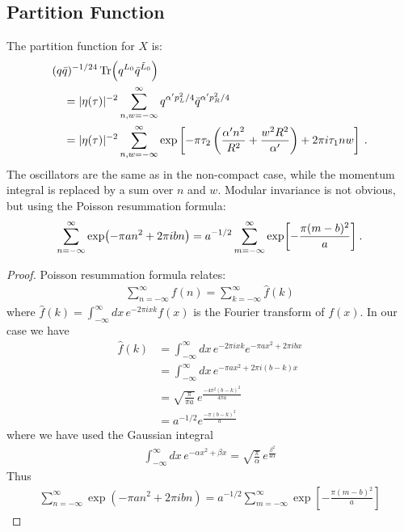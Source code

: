 \subsection*{Partition Function}
The partition function for $X$ is:
\begin{align}
	&(q \bar{q})^{-1 / 24} \operatorname{Tr}\Bigl(q^{L_{0}} \bar{q}^{\tilde{L}_{0}}\Bigr) \nonumber \\
	&\quad =|\eta(\tau)|^{-2} \sum_{n, w=-\infty}^{\infty} q^{\alpha^{\prime} p_{L}^{2} / 4} \bar{q}^{\alpha^{\prime} p_{R}^{2} / 4} \nonumber \\
	&\quad =|\eta(\tau)|^{-2} \sum_{n, w=-\infty}^{\infty} \exp \left[-\pi \tau_{2}\left(\frac{\alpha^{\prime} n^{2}}{R^{2}}+\frac{w^{2} R^{2}}{\alpha^{\prime}}\right)+2 \pi i \tau_{1} n w\right] \:. \label{8.2.9}
\end{align}
The oscillators are the same as in the non-compact case, while the momentum integral is replaced by a sum over $n$ and $w$. Modular invariance is not obvious, but using the Poisson resummation formula:
\begin{equation}
	\sum_{n=-\infty}^{\infty} \exp (-\pi a n^{2}+2 \pi i b n)=a^{-1 / 2} 
	\sum_{m=-\infty}^{\infty} \exp \biggl[-\frac{\pi(m-b)^{2}}{a}\biggr] \:. \label{8.2.10}
\end{equation}
\begin{tcolorbox}[breakable]
	\begin{proof}
		Poisson resummation formula relates:
		\begin{align*}
			\sum_{n=-\infty}^{\infty} f(n) = \sum_{k=-\infty}^{\infty} \hat{f}(k) \tag{8.88}
		\end{align*}		
		where \(\hat{f}(k) = \int_{-\infty}^{\infty} dx \, e^{-2\pi i x k} f(x)\) is the Fourier transform of \(f(x)\). In our case we have
		\begin{align*}
			\hat{f}(k) &= \int_{-\infty}^{\infty} dx \, e^{-2\pi i x k} e^{-\pi a x^2 + 2\pi ibx} \\
			&= \int_{-\infty}^{\infty} dx \, e^{-\pi a x^2 + 2\pi i (b-k)x} \\
			&= \sqrt{\frac{\pi}{\pi a}} \, e^{\frac{-4\pi^2 (b-k)^2}{4\pi a}} \\
			&= a^{-1/2} e^{\frac{-\pi (b-k)^2}{a}} \tag{8.89}
		\end{align*}
		where we have used the Gaussian integral
		\begin{align*}
			\int_{-\infty}^{\infty} dx \, e^{-\alpha x^2 + \beta x} = \sqrt{\frac{\pi}{\alpha}} \, e^{\frac{\beta^2}{4\alpha}}
		\end{align*}
		Thus
		\begin{align*}
			\sum_{n=-\infty}^{\infty} \exp\left(-\pi a n^2 + 2\pi i b n\right) 
			= a^{-1/2} \sum_{m=-\infty}^{\infty} \exp\left[-\frac{\pi (m-b)^2}{a}\right]
		\end{align*}
	\end{proof}
\end{tcolorbox}
